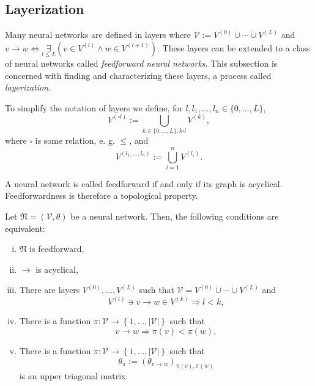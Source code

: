 \documentclass[a4paper,11pt]{report}
\begin{document}
\subsection{Layerization}\label{subsec:theory-structure-forms}

\begin{Par}
Many neural networks are defined in layers where $\mathcal{V}:=V^{(0)}\dot{\cup}\dotsb\dot{\cup}V^{(L)}$ and $v\to w\Leftrightarrow \underset{l\le L}{\exists}\left(v\in V^{(l)}\wedge w\in V^{(l+1)}\right)$. These layers can be extended to a class of neural networks called \emph{feedforward neural networks}. This subsection is concerned with finding and characterizing these layers, a process called \emph{layerization}.
\end{Par}

\begin{Not}
To simplify the notation of layers we define, for $l,l_1,\dotsc,l_n\in\{0,\dotsc,L\}$,
\[
V^{(\square l)}:=\bigcup_{k\in\{0,\dotsc,L\}:k\square l}V^{(k)},
\]
where $\square$ is some relation, e. g. $\le$, and
\[
V^{(l_1,\dotsc,l_n)}:=\bigcup_{i=1}^nV^{(l_i)}.
\]
\end{Not}

\begin{Def}
A neural network is called feedforward if and only if its graph is acyclical. Feedforwardness is therefore a topological property.
\end{Def}

\begin{Pro}\label{pro:chara-feedforward}
Let $\mathfrak{N}=(\mathcal{V},\theta)$ be a neural network. Then, the following conditions are equivalent:
\begin{enumerate}[(i)]
\item
$\mathfrak{N}$ is feedforward,
\item
$\to$ is acyclical,
\item
There are layers $V^{(0)},\dotsc,V^{(L)}$ such that $\mathcal{V}=V^{(0)}\dot{\cup}\dotsb\dot{\cup}V^{(L)}$ and 
\begin{equation}
V^{(l)}\ni v\to w\in V^{(k)}\Rightarrow l<k,
\end{equation}
\item
There is a function $\pi:\mathcal{V}\to\left\{1,\dotsc,|\mathcal{V}|\right\}$ such that
\begin{equation}\label{eq:chara-feedforward-iv}
v\to w\Rightarrow \pi(v)<\pi(w),
\end{equation}
\item
There is a function $\pi:\mathcal{V}\to\left\{1,\dotsc,|\mathcal{V}|\right\}$ such that
\begin{equation}\label{eq:chara-feedforward-v}
\theta_{\pi}:=\left(\theta_{v\to w}\right)_{\pi(v),\pi(w)}
\end{equation}
is an upper triagonal matrix.
\end{enumerate}
\end{Pro}
\end{document}
